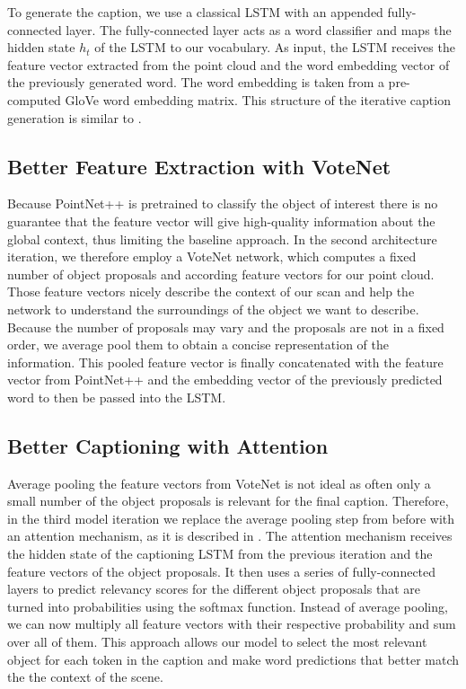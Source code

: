 \documentclass[10pt,twocolumn,letterpaper]{article}
\begin{document}
To generate the caption, we use a classical LSTM with an appended fully-connected layer. The fully-connected layer acts as a word classifier and maps the hidden state $h_{t}$ of the LSTM to our vocabulary. As input, the LSTM receives the feature vector extracted from the point cloud and the word embedding vector of the previously generated word. The word embedding is taken from a pre-computed GloVe \cite{pennington2014glove} word embedding matrix. This structure of the iterative caption generation is similar to \cite{xu2015show}.

\subsection{Better Feature Extraction with VoteNet}

Because PointNet++ is pretrained to classify the object of interest there is no guarantee that the feature vector will give high-quality information about the global context, thus limiting the baseline approach. In the second architecture iteration, we therefore employ a VoteNet \cite{qi2019deep} network, which computes a fixed number of object proposals and according feature vectors for our point cloud. Those feature vectors nicely describe the context of our scan and help the network to understand the surroundings of the object we want to describe. Because the number of proposals may vary and the proposals are not in a fixed order, we average pool them to obtain a concise representation of the information. This pooled feature vector is finally concatenated with the feature vector from PointNet++ and the embedding vector of the previously predicted word to then be passed into the LSTM.

\subsection{Better Captioning with Attention}

Average pooling the feature vectors from VoteNet is not ideal as often only a small number of the object proposals is relevant for the final caption. Therefore, in the third model iteration we replace the average pooling step from before with an attention mechanism, as it is described in \cite{xu2015show}. The attention mechanism receives the hidden state of the captioning LSTM from the previous iteration and the feature vectors of the object proposals. It then uses a series of fully-connected layers to predict relevancy scores for the different object proposals that are turned into probabilities using the softmax function. Instead of average pooling, we can now multiply all feature vectors with their respective probability and sum over all of them. This approach allows our model to select the most relevant object for each token in the caption and make word predictions that better match the the context of the scene.
\end{document}
